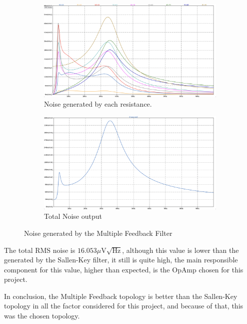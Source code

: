 \begin{figure}[H]
    \centering
    \begin{subfigure}{0.45\textwidth}
        \includegraphics*[width=\textwidth]{Images/NoiseResMFB.png}
        \caption{Noise generated by each resistance.}
        \label{fig:NoiseResMFB}  
    \end{subfigure}
    \begin{subfigure}{0.45\textwidth}
        \includegraphics*[width=\textwidth]{Images/NoiseTotalMFB.png}
        \caption{Total Noise output}
        \label{fig:NoiseTotalMFB}    
    \end{subfigure}
    \caption{Noise generated by the Multiple Feedback Filter}
    \label{fig:NoiseMFB}
\end{figure}

The total RMS noise is $16.053\mu \si{\volt}\sqrt{\si{\hertz}}$, although this value is lower than the generated by the Sallen-Key filter, it still is quite high, the main responsible component for this value, higher than expected, is the OpAmp chosen for this project.

In conclusion, the Multiple Feedback topology is better than the Sallen-Key topology in all the factor considered for this project, and because of that, this was the chosen topology.